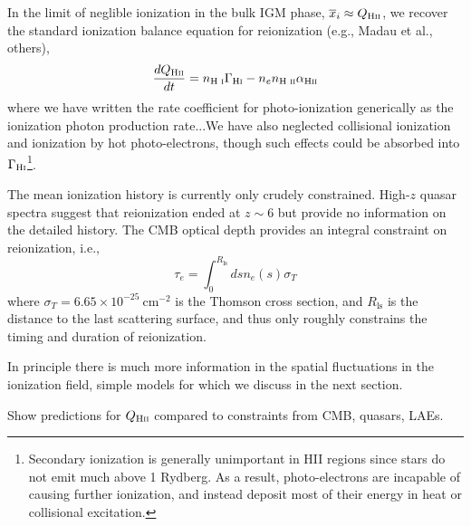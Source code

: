In the limit of neglible ionization in the bulk IGM phase, $\overline{x}_i \approx Q_{\text{H} {\textsc{ii}}}$, we recover the standard ionization balance equation for reionization (e.g., Madau et al., others),
\begin{equation}
	\frac{d Q_{\text{H} {\textsc{ii}}}}{dt} = n_{\text{H } \textsc{i}} \Gamma_{\text{H} {\textsc{i}}} - n_e n_{\text{H } \textsc{ii}} \alpha_{\text{H} {\textsc{ii}}} \label{eq:ion_balance}
\end{equation}
where we have written the rate coefficient for photo-ionization generically as {\color{red} the ionization photon production rate}...We have also neglected collisional ionization and ionization by hot photo-electrons, though such effects could be absorbed into $\Gamma_{\text{H} {\textsc{i}}}$\footnote{Secondary ionization is generally unimportant in HII regions since stars do not emit much above 1 Rydberg. As a result, photo-electrons are incapable of causing further ionization, and instead deposit most of their energy in heat or collisional excitation.}.



The mean ionization history is currently only crudely constrained. High-$z$ quasar spectra suggest that reionization ended at $z \sim 6$ but provide no information on the detailed history. The CMB optical depth provides an integral constraint on reionization, i.e.,
\begin{equation}
	\tau_e = \int_0^{R_{\mathrm{ls}}} ds n_e (s) \sigma_T
\end{equation}
where $\sigma_T = 6.65 \times 10^{-25} \ \mathrm{cm}^{-2}$ is the Thomson cross section, and $R_{\mathrm{ls}}$ is the distance to the last scattering surface, and thus only roughly constrains the timing and duration of reionization. 

In principle there is much more information in the spatial fluctuations in the ionization field, simple models for which we discuss in the next section.

{\color{red} Show predictions for $Q_{\text{H} {\textsc{ii}}}$ compared to constraints from CMB, quasars, LAEs.}



